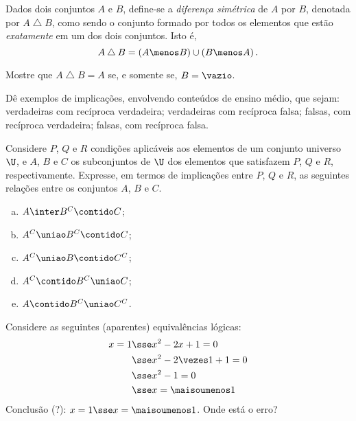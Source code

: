 \begin{exercise}
  Dados dois conjuntos $A$ e $B$, define-se a \emph{diferença simétrica} de $A$ por $B$, denotada por $A \bigtriangleup B$, como sendo o conjunto formado por todos os elementos que estão \emph{exatamente} em um dos dois conjuntos. Isto é,
$$A \bigtriangleup B = \left( A \menos B \right) \cup \left( B \menos A \right).$$

Mostre que $A \bigtriangleup B = A$ se, e somente se, $B = \vazio$.
\end{exercise}

\begin{exercise}
  Dê exemplos de implicações, envolvendo conteúdos de ensino médio, que sejam: verdadeiras com recíproca verdadeira; verdadeiras com recíproca falsa; falsas, com recíproca verdadeira; falsas, com recíproca falsa.
\end{exercise}

\begin{exercise}
  Considere $P$, $Q$ e $R$ condições aplicáveis aos elementos de um conjunto universo $\U$, e $A$, $B$ e $C$ os subconjuntos de $\U$ dos elementos que satisfazem $P$, $Q$ e $R$, respectivamente. Expresse, em termos de implicações entre $P$, $Q$ e $R$, as seguintes relações entre os conjuntos $A$, $B$ e $C$.
  \begin{enumerate}[a)]
    \item $A \inter B^C \contido C$;
    \item $A^C \uniao B^C \contido C$;
    \item $A^C \uniao B \contido C^C$;
    \item $A^C \contido B^C \uniao C$;
    \item $A \contido B^C \uniao C^C$.
  \end{enumerate}
\end{exercise}

\begin{exercise}
  Considere as seguintes (aparentes) equivalências lógicas:
  \begin{align*}
    x = 1 & \sse x^2 -2x +1 = 0         \\
          & \sse x^2 -2 \vezes 1 +1 = 0 \\
          & \sse x^2 - 1 = 0            \\
          & \sse x = \maisoumenos 1
  \end{align*}
  Conclusão (?): $x = 1 \sse x = \maisoumenos 1$. Onde está o erro?
\end{exercise}

